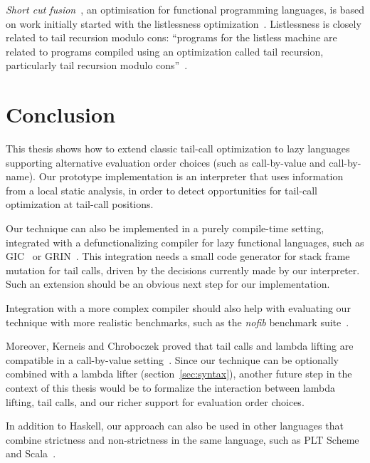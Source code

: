 \documentclass[diploma]{softlab-thesis}
\begin{document}
\emph{Short cut fusion}~\cite{Gill:1993:SCD:165180.165214,Pardo16}, an 
optimisation for functional programming languages, is based 
on work initially started with the listlessness optimization~\cite{Wadler84}. 
Listlessness is closely related to tail recursion modulo cons: 
``programs for the listless machine are related to programs compiled using 
an optimization called tail recursion, particularly tail recursion 
modulo cons''~\cite{Wadler84}.

\chapter{Conclusion}
\label{ch:conclusion}


This thesis shows how to extend classic tail-call optimization to lazy
languages supporting alternative evaluation order choices (such as
call-by-value and call-by-name). Our prototype implementation is an
interpreter that uses information from a local static analysis, in
order to detect opportunities for tail-call optimization at tail-call
positions.

Our technique can also be implemented in a purely compile-time
setting, integrated with a defunctionalizing compiler for lazy
functional languages, such as GIC~\cite{Fourtounis14} or
GRIN~\cite{Boquist96,Podlovics19}.  This integration needs a small
code generator for stack frame mutation for tail calls, driven by the
decisions currently made by our interpreter. Such an extension should
be an obvious next step for our implementation.

Integration with a more complex compiler should also help with
evaluating our technique with more realistic benchmarks, such as the
\emph{nofib} benchmark suite~\cite{nofib}.

Moreover, Kerneis and Chroboczek proved that tail calls and lambda
lifting are compatible in a call-by-value
setting~\cite{Kerneis2011}. Since our technique can be optionally
combined with a lambda lifter (section~\ref{sec:syntax}), another
future step in the context of this thesis would be to formalize the
interaction between lambda lifting, tail calls, and our richer support
for evaluation order choices.

In addition to Haskell, our approach can also be used in other
languages that combine strictness and non-strictness in the same language,
such as PLT Scheme~\cite{Barzilay2005} and Scala~\cite{Wampler:2009:PSS:1734084}.
\end{document}
